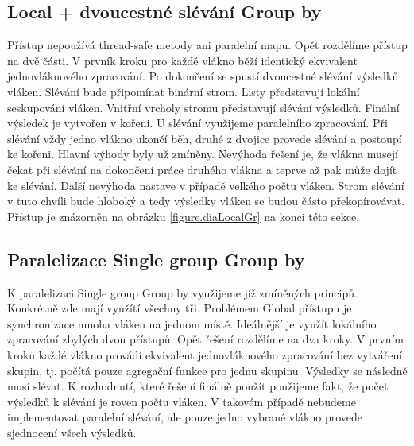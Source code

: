 \subsection{Local + dvoucestné slévání Group by} \label{anal.groupby.local}

Přístup nepoužívá thread-safe metody ani paralelní mapu.
Opět rozdělíme přístup na dvě části.
V prvník kroku pro každé vlákno běží identický ekvivalent jednovláknového zpracování.
Po dokončení se spustí dvoucestné slévání výsledků vláken.
Slévání bude připomínat binární strom.
Listy představují lokální seskupování vláken.
Vnitřní vrcholy stromu představují slévání výsledků.
Finální výsledek je vytvořen v kořeni.
U slévání využijeme paralelního zpracování.
Při slévání vždy jedno vlákno ukončí běh, druhé z dvojice provede slévání a postoupí ke kořeni. 
Hlavní výhody byly už zmíněny.
Nevýhoda řešení je, že vlákna musejí čekat při slévání na dokončení práce druhého vlákna a teprve až pak může dojít ke slévání.
Další nevýhoda nastave v případě velkého počtu vláken.
Strom slévání v tuto chvíli bude hloboký a tedy výsledky vláken se budou částo překopírovávat. 
Přístup je znázorněn na obrázku \ref{figure.diaLocalGr} na konci této sekce.

\subsection{Paralelizace Single group Group by} \label{anal.groupby.singlegroup}

K paralelizaci Single group Group by využijeme jíž zmíněných principů.
Konkrétně zde mají využítí všechny tři.
Problémem Global přístupu je synchronizace mnoha vláken na jednom místě.
Ideálnější je využít lokálního zpracování zbylých dvou přístupů.
Opět řešení rozdělíme na dva kroky. 
V prvním kroku každé vlákno provádí ekvivalent jednovláknového zpracování bez vytváření skupin, tj. počítá pouze agregační funkce pro jednu skupinu.
Výsledky se následně musí slévat.
K rozhodnutí, které řešení finálně použít použijeme fakt, že počet výsledků k slévání je roven počtu vláken.
V takovém případě nebudeme implementovat paralelní slévání, ale pouze jedno vybrané vlákno provede sjednocení všech výsledků.


